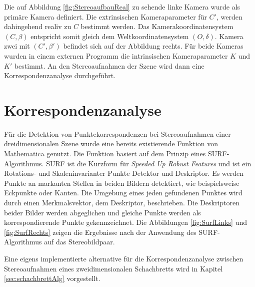 Die auf Abbildung \ref{fig:StereoaufbauReal} zu sehende linke Kamera wurde als primäre Kamera definiert. Die extrinsischen Kameraparameter für $C'$, werden dahingehend realiv zu $C$ bestimmt werden. Das Kamerakoordinatensystem $(C,\beta)$ entspricht somit gleich dem Weltkoordinatensystem $(O,\delta)$. Kamera zwei mit $(C',\beta')$ befindet sich auf der Abbildung rechts. Für beide Kameras wurden in einem externen Programm die intrinsischen Kameraparameter $K$ und $K'$ bestimmt. An den Stereoaufnahmen der Szene wird dann eine Korrespondenzanalyse durchgeführt.   

\section{Korrespondenzanalyse}


Für die Detektion von Punktekorrespondenzen bei Stereoaufnahmen einer dreidimensionalen Szene wurde eine bereits existierende Funktion von Mathematica genutzt\cite{Mathematica}. Die Funktion basiert auf dem Prinzip eines SURF-Algorithmus. SURF ist die Kurzform für \textit{Speeded Up Robust Features} und ist ein Rotations- und Skaleninvarianter Punkte Detektor und Deskriptor\cite{SURF,SIFTSURF}. Es werden Punkte an markanten Stellen in beiden Bildern detektiert, wie beispielsweise Eckpunkte oder Kanten. Die Umgebung eines jeden gefundenen Punktes wird durch einen Merkmalsvektor, dem Deskriptor, beschrieben. Die Deskriptoren beider Bilder werden abgeglichen und gleiche Punkte werden als korrespondierende Punkte gekennzeichnet\cite{SURF,SIFTSURF}. Die Abbildungen \ref{fig:SurfLinks} und \ref{fig:SurfRechts} zeigen die Ergebnisse nach der Anwendung des SURF-Algorithmus auf das Stereobildpaar. 
\pagebreak

Eine eigens implementierte alternative für die Korrespondenzanalyse zwischen Stereoaufnahmen eines zweidimensionalen Schachbretts wird in Kapitel \ref{sec:schachbrettAlg} vorgestellt.  


